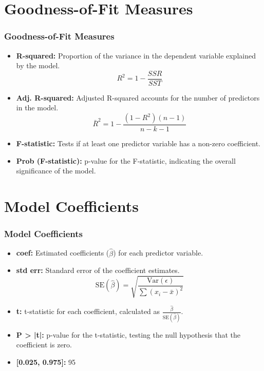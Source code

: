 \documentclass{beamer}
\begin{document}
\section{Goodness-of-Fit Measures}
\begin{frame}
    \frametitle{Goodness-of-Fit Measures}
    \begin{itemize}
        \item \textbf{R-squared:} Proportion of the variance in the dependent variable explained by the model.
        \[
        R^2 = 1 - \frac{SSR}{SST}
        \]
        \item \textbf{Adj. R-squared:} Adjusted R-squared accounts for the number of predictors in the model.
        \[
        \bar{R}^2 = 1 - \frac{(1 - R^2)(n - 1)}{n - k - 1}
        \]
        \item \textbf{F-statistic:} Tests if at least one predictor variable has a non-zero coefficient.
        \item \textbf{Prob (F-statistic):} p-value for the F-statistic, indicating the overall significance of the model.
    \end{itemize}
\end{frame}

\section{Model Coefficients}
\begin{frame}
    \frametitle{Model Coefficients}
    \begin{itemize}
        \item \textbf{coef:} Estimated coefficients (\(\hat{\beta}\)) for each predictor variable.
        \item \textbf{std err:} Standard error of the coefficient estimates.
        \[
        \text{SE}(\hat{\beta}) = \sqrt{\frac{\text{Var}(\epsilon)}{\sum (x_i - \bar{x})^2}}
        \]
        \item \textbf{t:} t-statistic for each coefficient, calculated as \(\frac{\hat{\beta}}{\text{SE}(\hat{\beta})}\).
        \item \textbf{P > |t|:} p-value for the t-statistic, testing the null hypothesis that the coefficient is zero.
        \item \textbf{[0.025, 0.975]:} 95%
    \end{itemize}
\end{frame}
\end{document}
